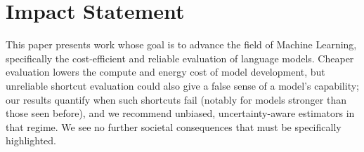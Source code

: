 \documentclass{article}
\theoremstyle{plain}
\theoremstyle{remark}
\begin{document}

\printAffiliationsAndNotice{}








\section*{Impact Statement}
This paper presents work whose goal is to advance the field of Machine Learning, specifically the cost-efficient and reliable evaluation of language models. Cheaper evaluation lowers the compute and energy cost of model development, but unreliable shortcut evaluation could also give a false sense of a model's capability; our results quantify when such shortcuts fail (notably for models stronger than those seen before), and we recommend unbiased, uncertainty-aware estimators in that regime. We see no further societal consequences that must be specifically highlighted.




\newpage
\appendix
\onecolumn

\end{document}
